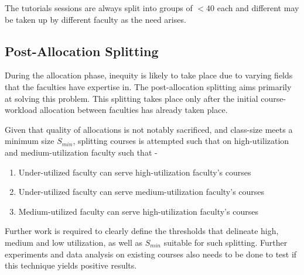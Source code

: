 The tutorials sessions are always split into groups of \(< 40\) each and different may be taken up by different faculty as the need arises.

\subsection{Post-Allocation Splitting}
During the allocation phase, inequity is likely to take place due to varying fields that the faculties have expertise in. The post-allocation splitting aims primarily at solving this problem. This splitting takes place only after the initial course-workload allocation between faculties has already taken place.

Given that quality of allocations is not notably sacrificed, and class-size meets a minimum size \(S_{min}\), splitting courses is attempted such that on high-utilization and medium-utilization faculty such that -

\begin{enumerate}
    \item Under-utilized faculty can serve high-utilization faculty’s courses
    \item Under-utilized faculty can serve medium-utilization faculty’s courses
    \item Medium-utilized faculty can serve high-utilization faculty’s courses
\end{enumerate}

Further work is required to clearly define the thresholds that delineate high, medium and low utilization, as well as \(S_{min}\) suitable for such splitting. Further experiments and data analysis on existing courses also needs to be done to test if this technique yields positive results.






